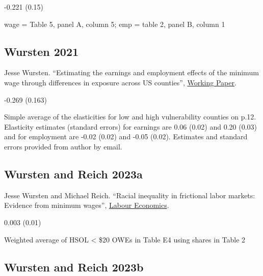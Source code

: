  -0.221 (0.15)

\vspace{0.7em}

 wage = Table 5, panel A, column 5; emp = table 2, panel B, column 1

\subsection*{Wursten 2021}
\vspace{-0.7em}

\noindent Jesse Wursten. ``Estimating the earnings and employment effects of the minimum wage through differences in exposure across US counties'', \href{https://www.dropbox.com/s/2f5j0mjyama8q0p/CAMWE_draft36.pdf?dl=0}{Working Paper}.

\vspace{0.7em}

 -0.269 (0.163)

\vspace{0.7em}

 Simple average of the elasticities for low and high vulnerability counties on p.12. Elasticity estimates (standard errors) for earnings are 0.06 (0.02) and 0.20 (0.03) and for employment are -0.02 (0.02) and -0.05 (0.02). Estimates and standard errors provided from author by email.

\subsection*{Wursten and Reich 2023a}
\vspace{-0.7em}

\noindent Jesse Wursten and Michael Reich. ``Racial inequality in frictional labor markets: Evidence from minimum wages'', \href{https://doi.org/10.1016/j.labeco.2023.102344}{Labour Economics}.

\vspace{0.7em}

 0.003 (0.01)

\vspace{0.7em}

 Weighted average of HSOL < \$20 OWEs in Table E4 using shares in Table 2

\subsection*{Wursten and Reich 2023b}
\vspace{-0.7em}

